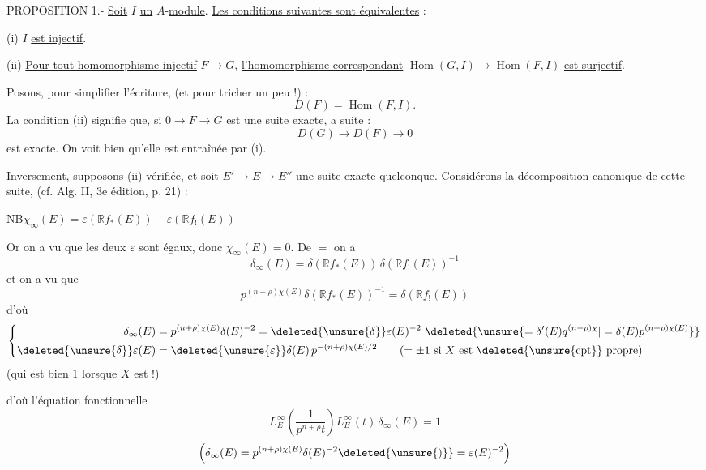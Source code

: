 PROPOSITION 1.- \uline{Soit} $I$ \uline{un} $A$-\uline{module}. \uline{Les conditions suivantes sont équivalentes} :

(i) \quad $I$ \uline{est injectif}.

(ii) \quad \uline{Pour tout homomorphisme injectif} $F\longrightarrow G$, \uline{l'homomorphisme correspondant} $\operatorname{Hom}(G,I)\longrightarrow\operatorname{Hom}(F,I)$ \uline{est surjectif}.

Posons, pour simplifier l'écriture, (et pour tricher un peu !) :
\[
D(F)=\operatorname{Hom}(F,I).
\]
La condition (ii) signifie que, si $0\longrightarrow F\longrightarrow G$ est une suite exacte, a suite :
\[
D(G)\longrightarrow D(F)\longrightarrow 0
\]
est exacte. On voit bien qu'elle est entraînée par (i).

Inversement, supposons (ii) vérifiée, et soit $E'\longrightarrow E\longrightarrow E''$ une suite exacte quelconque. Considérons la décomposition canonique de cette suite, (cf. Alg. II, 3e édition, p. 21) :

\uline{NB}\quad $\chi_\infty(E)=\varepsilon(\mathbb R f_*(E))-\varepsilon(\mathbb R f_!(E))$

Or on a vu que les deux $\varepsilon$ sont égaux, donc $\chi_\infty(E)=0$. De $=$ on a
\[
\delta_\infty(E)=\delta(\mathbb R f_*(E))\,\delta(\mathbb R f_!(E))^{-1}
\]
et on a vu que
\[
p^{(n+\rho)\chi(E)}\delta(\mathbb R f_*(E))^{-1}=\delta(\mathbb R f_!(E))
\]
d'où
\[
\left\{\begin{aligned}
\delta_\infty(E)&=p^{(n+\rho)\chi(E)}\delta(E)^{-2}
 =\deleted{\unsure{\delta}}\varepsilon(E)^{-2}\ \deleted{\unsure{=\delta'(E)q^{(n+\rho)\chi}|=\delta(E)p^{(n+\rho)\chi(E)}}}\\
\deleted{\unsure{\delta}}\varepsilon(E)&=\deleted{\unsure{\varepsilon}}\delta(E)\,p^{-(n+\rho)\chi(E)/2}
 \qquad (=\pm1\ \text{si $X$ est \deleted{\unsure{cpt}} propre})
\end{aligned}\right.
\]
(qui est bien $1$ lorsque $X$ est  !)

d'où l'équation fonctionnelle
\[
\boxed{L_E^\infty\left(\frac{1}{p^{n+\rho}t}\right)L_E^\infty(t)\,\delta_\infty(E)=1}
\]
\[
\left(\delta_\infty(E)=p^{(n+\rho)\chi(E)}\delta(E)^{-2}\deleted{\unsure{)}}=\varepsilon(E)^{-2}\right)
\]


